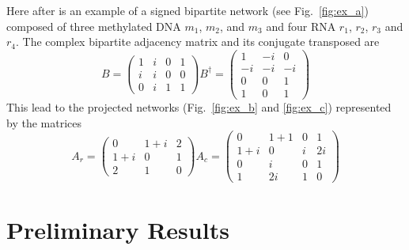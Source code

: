 \documentclass[10pt,a4paper]{article}
\begin{document}
Here after is an example of a signed bipartite network (see Fig.~\ref{fig:ex_a}) composed of three methylated DNA $m_{1}$, $m_{2}$, and $m_{3}$ and four RNA $r_{1}$, $r_{2}$, $r_{3}$ and $r_{4}$. The complex bipartite adjacency matrix and its conjugate transposed are
\begin{equation}
B=\begin{pmatrix}
1&i&0&1\\
i&i&0&0\\
0&i&1&1
\end{pmatrix}
B^{\dagger}=\begin{pmatrix}
1&-i&0\\
-i&-i&-i\\
0&0&1\\
1&0&1
\end{pmatrix}
\label{eq:example}
\end{equation}
This lead to the projected networks (Fig.~\ref{fig:ex_b} and \ref{fig:ex_c}) represented by the matrices
\begin{equation}
A_{r}=\begin{pmatrix}
0&1+i&2\\
1+i&0&1\\
2&1&0
\end{pmatrix}
A_{c}=\begin{pmatrix}
0&1+1&0&1\\
1+i&0&i&2i\\
0&i&0&1\\
1&2i&1&0
\end{pmatrix}
\label{eq:example2}
\end{equation}

\section{Preliminary Results}
\end{document}

